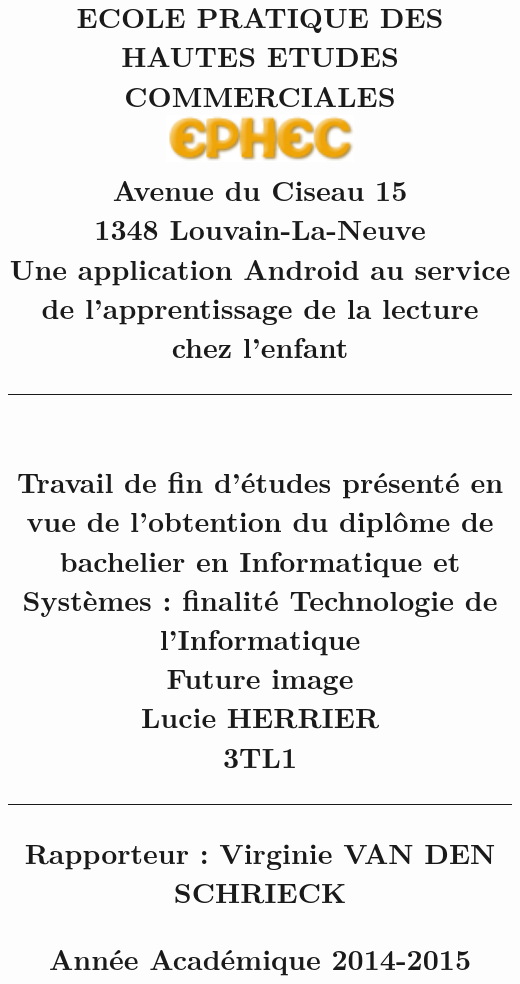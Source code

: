 \title{
\parbox{15cm}
{	
	\begin{center}
	\large ECOLE PRATIQUE DES HAUTES ETUDES COMMERCIALES\\
	\vspace{.5cm}
	\includegraphics[width=5cm]{ephec.png}\\
	Avenue du Ciseau 15\\
	1348 Louvain-La-Neuve\\
	\vspace{2cm}
	\sf\bfseries\Huge
	Une application Android au service de l'apprentissage de la lecture chez l'enfant 
	\rule{15cm}{1pt}\\
	\normalsize\mdseries Travail de fin d'études présenté en vue de l'obtention du diplôme de bachelier en Informatique et Systèmes : finalité Technologie de l'Informatique\\
	\vspace{1cm}
	Future image\\
	\vspace{.5cm}
	\bfseries\LARGE
		Lucie HERRIER\\ \Large 3TL1
	\rule{15cm}{1pt}
	\end{center}
	\vspace{1cm}
	\bf\normalsize Rapporteur : Virginie VAN DEN SCHRIECK
	\vspace{4cm}
	\begin{center}
	\Large Année Académique 2014-2015
	\end{center}
}} 
